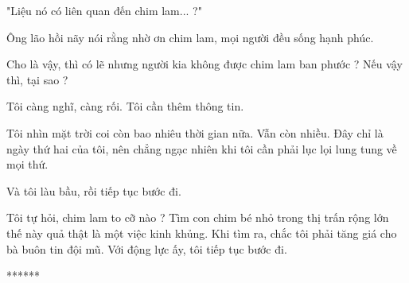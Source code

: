 "Liệu nó có liên quan đến chim lam... ?"

Ông lão hồi nãy nói rằng nhờ ơn chim lam, mọi người đều sống hạnh phúc.

Cho là vậy, thì có lẽ nhưng người kia không được chim lam ban phước ? Nếu vậy thì, tại sao ?

Tôi càng nghĩ, càng rối. Tôi cần thêm thông tin.

Tôi nhìn mặt trời coi còn bao nhiêu thời gian nữa. Vẫn còn nhiều. Đây chỉ là ngày thứ hai của tôi, nên chẳng ngạc nhiên khi tôi cần phải lục lọi lung tung về mọi thứ.

Và tôi làu bầu, rồi tiếp tục bước đi.

Tôi tự hỏi, chim lam to cỡ nào ? Tìm con chim bé nhỏ trong thị trấn rộng lớn thế này quả thật là một việc kinh khủng. Khi tìm ra, chắc tôi phải tăng giá cho bà buôn tin đội mũ. Với động lực ấy, tôi tiếp tục bước đi. \\


 \begin{center}
 	******
 \end{center}



